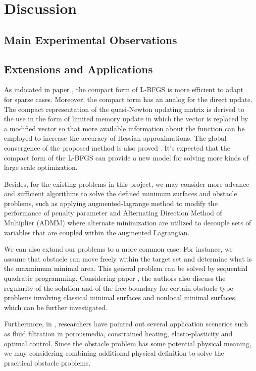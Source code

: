 \section{Discussion}
\subsection{Main Experimental Observations}
\subsection{Extensions and Applications}
As indicated in paper \cite{yueting2007compact}, the compact form of L-BFGS is more efficient to adapt for sparse cases. Moreover, the compact form has an analog for the direct update. The compact representation of the quasi-Newton updating matrix is derived to the use in the form of limited memory update in which the vector is replaced by a modified vector so that more available information about the function can be employed to increase the accuracy of Hessian approximations. The global convergence of the proposed method is also proved \cite{yueting2007compact}. It’s expected that the compact form of the L-BFGS can provide a new model for solving more kinds of large scale optimization. 

Besides, for the existing problems in this project, we may consider more advance and sufficient algorithms to solve the defined minimum surfaces and obstacle problems, such as applying augmented-lagrange method to modify the performance of penalty parameter and Alternating Direction Method of Multiplier (ADMM) where alternate minimization are utilized to decouple sets of variables that are coupled within the augmented Lagrangian.

We can also extand our problems to a more common case. For instance, we assume that obstacle can move freely within the target set and determine what is the maxmimum minimal area. This general problem can be solved by 
sequential quadratic programming. Considering paper \cite{caffarelli2016obstacle}, the authors also discuss the regularity of the solution and of the free boundary for certain obstacle type problems involving classical minimal surfaces and nonlocal minimal surfaces, which can be further investigated.

Furthermore, in \cite{attouch2014variational}, researchers have pointed out several application scenerios such as fluid filtration in porousmedia, constrained heating, elasto-plasticity and optimal control. Since the obstacle problem has some potential physical meaning, we may considering combining additional physical definition to solve the pracitical obstacle problems.
